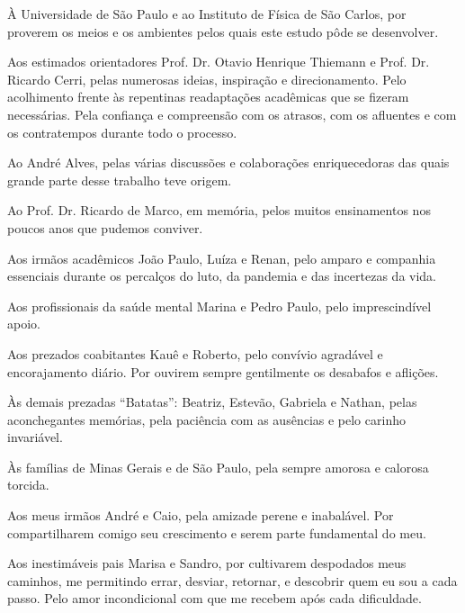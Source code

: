\begin{agradecimentos}
À Universidade de São Paulo e ao Instituto de Física de São Carlos, por proverem os meios e os ambientes pelos quais este estudo pôde se desenvolver.

Aos estimados orientadores Prof. Dr. Otavio Henrique Thiemann e Prof. Dr. Ricardo Cerri, pelas numerosas ideias, inspiração e direcionamento. Pelo acolhimento frente às repentinas readaptações acadêmicas que se fizeram necessárias.
Pela confiança e compreensão com os atrasos, com os afluentes e com os contratempos durante todo o processo.

Ao André Alves, pelas várias discussões e colaboraç\~oes enriquecedoras das quais grande parte desse trabalho teve origem.

Ao Prof. Dr. Ricardo de Marco, em memória, pelos muitos ensinamentos nos poucos anos que pudemos conviver.

Aos irmãos acadêmicos João Paulo, Luíza e Renan, pelo amparo e companhia essenciais durante os percalços do luto, da pandemia e das incertezas da vida.

Aos profissionais da saúde mental Marina e Pedro Paulo, pelo imprescindível apoio.

Aos prezados coabitantes Kauê e Roberto, pelo convívio agradável e encorajamento diário.
Por ouvirem sempre gentilmente os desabafos e aflições.

Às demais prezadas ``Batatas'': Beatriz, Estevão, Gabriela e Nathan, pelas aconchegantes memórias, pela paciência com as ausências e pelo carinho invariável.

Às famílias de Minas Gerais e de São Paulo, pela sempre amorosa e calorosa torcida.

Aos meus irmãos André e Caio, pela amizade perene e inabalável. Por compartilharem comigo seu crescimento e serem parte fundamental do meu.

%

%
%
%

Aos inestimáveis pais Marisa e Sandro, por cultivarem despodados meus caminhos, me permitindo errar, desviar, retornar, e descobrir quem eu sou a cada passo. Pelo amor incondicional com que me recebem após cada dificuldade.


\end{agradecimentos}

